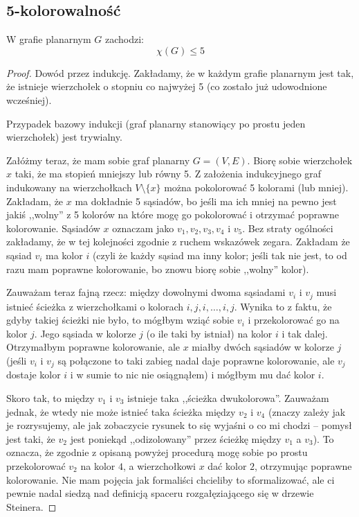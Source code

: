 \subsection{5-kolorowalność}
\begin{theorem}
	W grafie planarnym $G$ zachodzi:
	\begin{equation}
		\chi(G) \leq 5
	\end{equation}
\end{theorem}


\begin{proof}
	Dowód przez indukcję. Zakładamy, że w każdym grafie planarnym jest tak, że istnieje wierzchołek o stopniu co najwyżej 5 (co zostało już udowodnione wcześniej).

	Przypadek bazowy indukcji (graf planarny stanowiący po prostu jeden wierzchołek) jest trywialny.

	Załóżmy teraz, że mam sobie graf planarny $G = (V,E)$. Biorę sobie wierzchołek $x$ taki, że ma stopień mniejszy lub równy 5. Z założenia indukcyjnego graf indukowany na wierzchołkach $V \setminus \{x\}$ można pokolorować 5 kolorami (lub mniej). Zakładam, że $x$ ma dokładnie 5 sąsiadów, bo jeśli ma ich mniej na pewno jest jakiś ,,wolny'' z 5 kolorów na które mogę go pokolorować i otrzymać poprawne kolorowanie. Sąsiadów $x$ oznaczam jako $v_1, v_2, v_3, v_4$ i $v_5$. Bez straty ogólności zakładamy, że w tej kolejności zgodnie z ruchem wskazówek zegara. Zakładam że sąsiad $v_i$ ma kolor $i$ (czyli że każdy sąsiad ma inny kolor; jeśli tak nie jest, to od razu mam poprawne kolorowanie, bo znowu biorę sobie ,,wolny'' kolor).

	Zauważam teraz fajną rzecz: między dowolnymi dwoma sąsiadami $v_i$ i $v_j$ musi istnieć ścieżka z wierzchołkami o kolorach $i, j, i, \dots, i, j$. Wynika to z faktu, że gdyby takiej ścieżki nie było, to mógłbym wziąć sobie $v_i$ i przekolorować go na kolor $j$. Jego sąsiada w kolorze $j$ (o ile taki by istniał) na kolor $i$ i tak dalej. Otrzymałbym poprawne kolorowanie, ale $x$ miałby dwóch sąsiadów w kolorze $j$ (jeśli $v_i$ i $v_j$ są połączone to taki zabieg nadal daje poprawne kolorowanie, ale $v_j$ dostaje kolor $i$ i w sumie to nic nie osiągnąłem) i mógłbym mu dać kolor $i$.

	Skoro tak, to między $v_1$ i $v_3$ istnieje taka ,,ścieżka dwukolorowa''. Zauważam jednak, że wtedy nie może istnieć taka ścieżka między $v_2$ i $v_4$ (znaczy zależy jak je rozrysujemy, ale jak zobaczycie rysunek to się wyjaśni o co mi chodzi -- pomysł jest taki, że $v_2$ jest poniekąd ,,odizolowany'' przez ścieżkę między $v_1$ a $v_3$). To oznacza, że zgodnie z opisaną powyżej procedurą mogę sobie po prostu przekolorować $v_2$ na kolor $4$, a wierzchołkowi $x$ dać kolor $2$, otrzymując poprawne kolorowanie. Nie mam pojęcia jak formaliści chcieliby to sformalizować, ale ci pewnie nadal siedzą nad definicją spaceru rozgałęziającego się w drzewie Steinera.


\end{proof}
